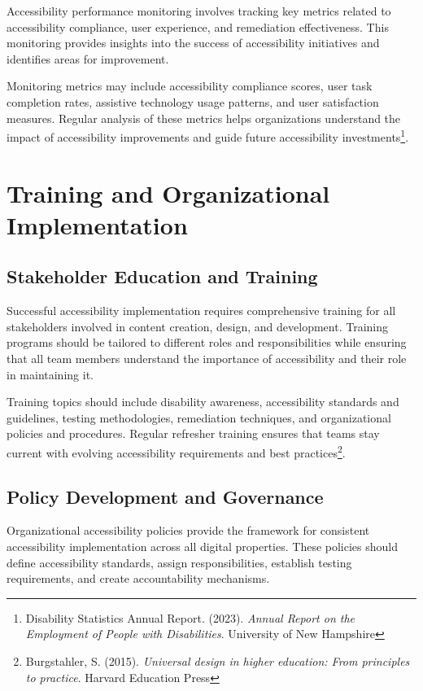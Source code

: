 Accessibility performance monitoring involves tracking key metrics related to accessibility compliance, user experience, and remediation effectiveness. This monitoring provides insights into the success of accessibility initiatives and identifies areas for improvement.

Monitoring metrics may include accessibility compliance scores, user task completion rates, assistive technology usage patterns, and user satisfaction measures. Regular analysis of these metrics helps organizations understand the impact of accessibility improvements and guide future accessibility investments\footnote{Disability Statistics Annual Report. (2023). \textit{Annual Report on the Employment of People with Disabilities}. University of New Hampshire}.

\section{Training and Organizational Implementation}

\subsection{Stakeholder Education and Training}

Successful accessibility implementation requires comprehensive training for all stakeholders involved in content creation, design, and development. Training programs should be tailored to different roles and responsibilities while ensuring that all team members understand the importance of accessibility and their role in maintaining it.

Training topics should include disability awareness, accessibility standards and guidelines, testing methodologies, remediation techniques, and organizational policies and procedures. Regular refresher training ensures that teams stay current with evolving accessibility requirements and best practices\footnote{Burgstahler, S. (2015). \textit{Universal design in higher education: From principles to practice}. Harvard Education Press}.

\subsection{Policy Development and Governance}

Organizational accessibility policies provide the framework for consistent accessibility implementation across all digital properties. These policies should define accessibility standards, assign responsibilities, establish testing requirements, and create accountability mechanisms.

